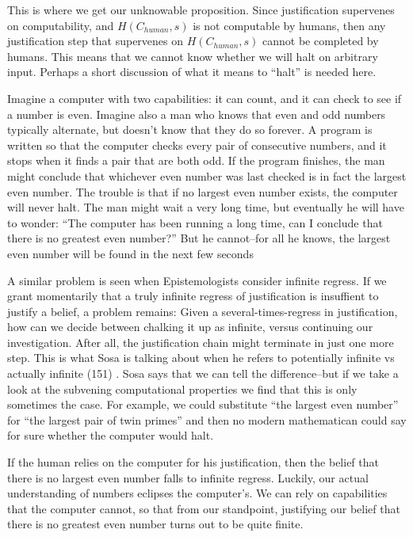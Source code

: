 \documentclass[12pt]{article}
\begin{document}
\begin{flushleft}
This is where we get our unknowable proposition.
Since justification supervenes on computability, and $H(C_{human}, s)$ is not computable by humans, then any justification step that supervenes on $H(C_{human}, s)$ cannot be completed by humans.
This means that we cannot know whether we will halt on arbitrary input.
Perhaps a short discussion of what it means to ``halt'' is needed here.

Imagine a computer with two capabilities: it can count, and it can check to see if a number is even.
Imagine also a man who knows that even and odd numbers typically alternate, but doesn't know that they do so forever.
A program is written so that the computer checks every pair of consecutive numbers, and it stops when it finds a pair that are both odd.
If the program finishes, the man might conclude that whichever even number was last checked is in fact the largest even number.
The trouble is that if no largest even number exists, the computer will never halt.
The man might wait a very long time, but eventually he will have to wonder: ``The computer has been running a long time, can I conclude that there is no greatest even number?''
But he cannot--for all he knows, the largest even number will be found in the next few seconds

A similar problem is seen when Epistemologists consider infinite regress.
If we grant momentarily that a truly infinite regress of justification is insuffient to justify a belief, a problem remains:
Given a several-times-regress in justification, how can we decide between chalking it up as infinite, versus continuing our investigation.
After all, the justification chain might terminate in just one more step.
This is what Sosa is talking about when he refers to potentially infinite vs actually infinite (151) .
Sosa says that we can tell the difference--but if we take a look at the subvening computational properties we find that this is only sometimes the case.
For example, we could substitute ``the largest even number'' for ``the largest pair of twin primes'' and then no modern mathematican could say for sure whether the computer would halt.

If the human relies on the computer for his justification, then the belief that there is no largest even number falls to infinite regress.
Luckily, our actual understanding of numbers eclipses the computer's.
We can rely on capabilities that the computer cannot, so that from our standpoint, justifying our belief that there is no greatest even number turns out to be quite finite.


\end{flushleft}
\end{document}
